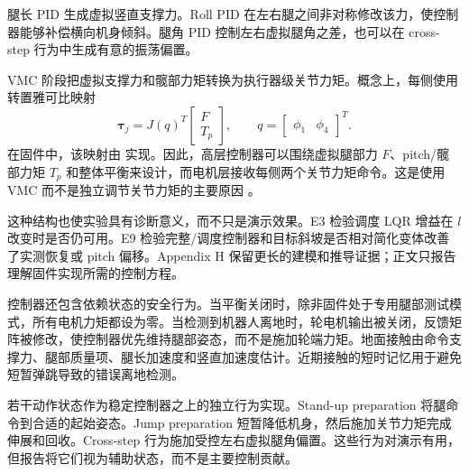 \documentclass[12pt, a4paper]{article}
\begin{document}
腿长 PID 生成虚拟竖直支撑力。Roll PID 在左右腿之间非对称修改该力，使控制器能够补偿横向机身倾斜。腿角 PID 控制左右虚拟腿角之差，也可以在 cross-step 行为中生成有意的振荡偏置。

VMC 阶段把虚拟支撑力和髋部力矩转换为执行器级关节力矩。概念上，每侧使用转置雅可比映射
\[
\boldsymbol{\tau}_{j}
= J(q)^{T}
\begin{bmatrix}
F \\
T_p
\end{bmatrix},
\qquad
q =
\begin{bmatrix}
\phi_1 & \phi_4
\end{bmatrix}^{T}.
\]
在固件中，该映射由 \texttt{} 实现。因此，高层控制器可以围绕虚拟腿部力 \(F\)、pitch/髋部力矩 \(T_p\) 和整体平衡来设计，而电机层接收每侧两个关节力矩命令。这是使用 VMC 而不是独立调节关节力矩的主要原因 \cite{pratt2001vmc}。

这种结构也使实验具有诊断意义，而不只是演示效果。E3 检验调度 LQR 增益在 \(l\) 改变时是否仍可用。E9 检验完整/调度控制器和目标斜坡是否相对简化变体改善了实测恢复或 pitch 偏移。Appendix H 保留更长的建模和推导证据；正文只报告理解固件实现所需的控制方程。

控制器还包含依赖状态的安全行为。当平衡关闭时，除非固件处于专用腿部测试模式，所有电机力矩都设为零。当检测到机器人离地时，轮电机输出被关闭，反馈矩阵被修改，使控制器优先维持腿部姿态，而不是施加轮端力矩。地面接触由命令支撑力、腿部质量项、腿长加速度和竖直加速度估计。近期接触的短时记忆用于避免短暂弹跳导致的错误离地检测。

若干动作状态作为稳定控制器之上的独立行为实现。Stand-up preparation 将腿命令到合适的起始姿态。Jump preparation 短暂降低机身，然后施加关节力矩完成伸展和回收。Cross-step 行为施加受控左右虚拟腿角偏置。这些行为对演示有用，但报告将它们视为辅助状态，而不是主要控制贡献。
\end{document}
